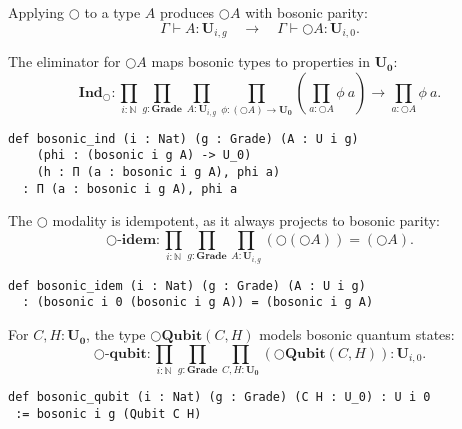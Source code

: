 \documentclass{article}
\begin{document}
\begin{definition}\label{def:bosonic-intro}
Applying $\bigcirc$ to a type $A$ produces $\bigcirc A$ with bosonic parity:
\[
    \Gamma \vdash A : \mathbf{U}_{i,g}
    \quad \to \quad
    \Gamma \vdash \bigcirc A : \mathbf{U}_{i,0}.
\]
\end{definition}

\begin{definition}\label{def:bosonic-elim}
The eliminator for $\bigcirc A$ maps bosonic types to properties in $\mathbf{U_0}$:
\[
\mathbf{Ind_{\bigcirc}} :
\prod_{i : \mathbb{N}} \prod_{g : \mathbf{Grade}}
\prod_{A : \mathbf{U}_{i,g}} \prod_{\phi : (\bigcirc A) \to \mathbf{U_0}}
\left( \prod_{a : \bigcirc A} \phi\ a \right) \to \prod_{a : \bigcirc A} \phi\ a.
\]
\begin{lstlisting}[mathescape=true]
def bosonic_ind (i : Nat) (g : Grade) (A : U i g)
    (phi : (bosonic i g A) -> U_0)
    (h : Π (a : bosonic i g A), phi a)
  : Π (a : bosonic i g A), phi a
\end{lstlisting}
\end{definition}

\begin{theorem}\label{thm:bosonic-idempotence}
The $\bigcirc$ modality is idempotent, as it always projects to bosonic parity:
\[
    \mathbf{\bigcirc\text{-}idem} :
    \prod_{i : \mathbb{N}} \prod_{g : \mathbf{Grade}}
    \prod_{A : \mathbf{U}_{i,g}}
    (\bigcirc (\bigcirc A)) = (\bigcirc A).
\]
\begin{lstlisting}[mathescape=true]
def bosonic_idem (i : Nat) (g : Grade) (A : U i g)
  : (bosonic i 0 (bosonic i g A)) = (bosonic i g A)
\end{lstlisting}
\end{theorem}

\begin{theorem}\label{thm:bosonic-qubit}
For $C, H : \mathbf{U_0}$, the type $\bigcirc \mathbf{Qubit}(C, H)$ models bosonic quantum states:
\[
    \mathbf{\bigcirc\text{-}qubit} :
    \prod_{i : \mathbb{N}} \prod_{g : \mathbf{Grade}}
    \prod_{C, H : \mathbf{U_0}}
    (\bigcirc \mathbf{Qubit}(C, H)) : \mathbf{U}_{i,0}.
\]
\begin{lstlisting}[mathescape=true]
def bosonic_qubit (i : Nat) (g : Grade) (C H : U_0) : U i 0
 := bosonic i g (Qubit C H)

\end{lstlisting}
\end{theorem}
\end{document}
